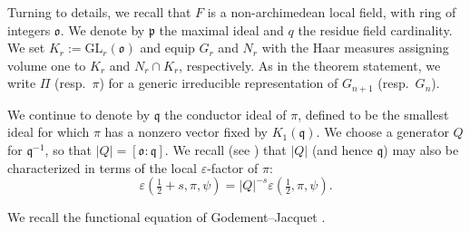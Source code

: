 \documentclass[reqno]{amsart}
\theoremstyle{plain}
\theoremstyle{definition}
\begin{document}
Turning to details, we recall that $F$ is a non-archimedean local field, with ring of integers $\mathfrak{o}$.  We denote by $\mathfrak{p}$ the maximal ideal and $q$ the residue field cardinality.  We set $K_r := \mathrm{GL}_r(\mathfrak{o})$ and equip $G_r$ and $N_r$ with the Haar measures assigning volume one to $K_r$ and $N_r \cap K_r$, respectively.  As in the theorem statement, we write $\Pi$ (resp.\ $\pi$) for a generic irreducible representation of $G_{n + 1}$ (resp.\ $G_n$).

We continue to denote by $\mathfrak{q}$ the conductor ideal of $\pi$, defined to be the smallest ideal for which $\pi$ has a nonzero vector fixed by $K_1(\mathfrak{q})$.  We choose a generator $Q$ for $\mathfrak{q}^{-1}$, so that $\lvert Q \rvert =[\mathfrak{o} : \mathfrak{q}]$.  We recall (see \cite{MR620708, MR3138844}) that $\lvert Q \rvert$ (and hence $\mathfrak{q}$) may also be characterized in terms of the local $\varepsilon$-factor of $\pi$:
\begin{equation}\label{eq:cuipy1wony}
  \varepsilon(\tfrac{1}{2} + s, \pi, \psi) = \lvert Q \rvert^{- s} \varepsilon(\tfrac{1}{2}, \pi, \psi).
\end{equation}

We recall the functional equation of Godement--Jacquet \cite[Theorem 3.3]{MR0342495}.
\end{document}
